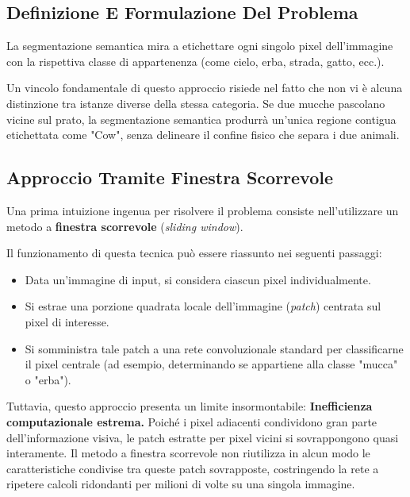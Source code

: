 ﻿\documentclass[11pt, a4paper]{article}
\begin{document}
\subsection{Definizione E Formulazione Del Problema}

La segmentazione semantica mira a etichettare ogni singolo pixel dell'immagine con la rispettiva classe di appartenenza (come cielo, erba, strada, gatto, ecc.).


Un vincolo fondamentale di questo approccio risiede nel fatto che non vi è alcuna distinzione tra istanze diverse della stessa categoria. Se due mucche pascolano vicine sul prato, la segmentazione semantica produrrà un'unica regione contigua etichettata come "Cow", senza delineare il confine fisico che separa i due animali.

\subsection{Approccio Tramite Finestra Scorrevole}

Una prima intuizione ingenua per risolvere il problema consiste nell'utilizzare un metodo a \textbf{finestra scorrevole} (\emph{sliding window}).


Il funzionamento di questa tecnica può essere riassunto nei seguenti passaggi:
\begin{itemize}
    \item Data un'immagine di input, si considera ciascun pixel individualmente.
    \item Si estrae una porzione quadrata locale dell'immagine (\emph{patch}) centrata sul pixel di interesse.
    \item Si somministra tale patch a una rete convoluzionale standard per classificarne il pixel centrale (ad esempio, determinando se appartiene alla classe "mucca" o "erba").
\end{itemize}

Tuttavia, questo approccio presenta un limite insormontabile:
\textbf{Inefficienza computazionale estrema.} Poiché i pixel adiacenti condividono gran parte dell'informazione visiva, le patch estratte per pixel vicini si sovrappongono quasi interamente. Il metodo a finestra scorrevole non riutilizza in alcun modo le caratteristiche condivise tra queste patch sovrapposte, costringendo la rete a ripetere calcoli ridondanti per milioni di volte su una singola immagine.
\end{document}
